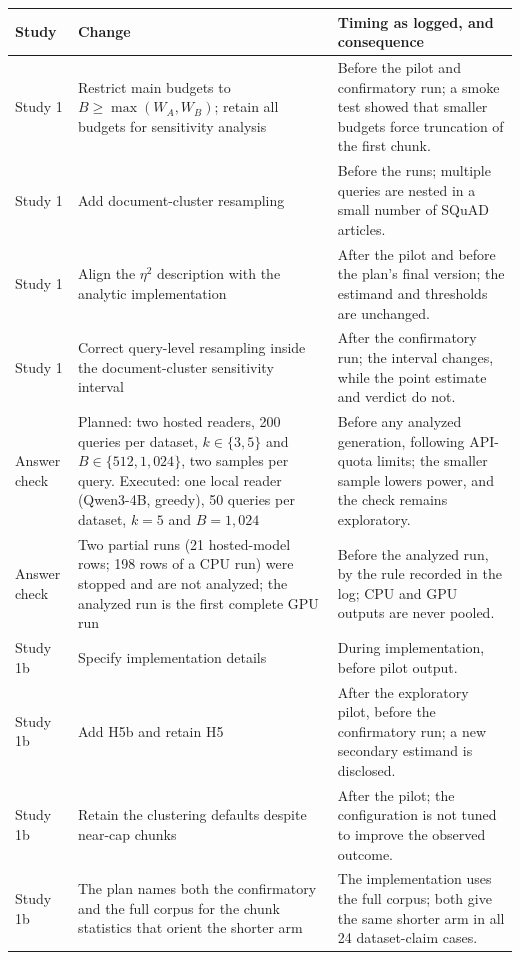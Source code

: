 \documentclass[11pt]{article}
\let\RepoTable\table
\let\EndRepoTable\endtable
\renewenvironment{table}[1][htbp]{\RepoTable[htbp]}{\EndRepoTable}
\begin{document}
\begin{table}[htbp]\centering\footnotesize
\caption{Study-plan deviations (as logged) and differences between the plans' text and the implementation.}\label{tab:deviations}
\begin{tabular}{@{}>{\raggedright\arraybackslash}p{1.55cm}>{\raggedright\arraybackslash}p{5.5cm}>{\raggedright\arraybackslash}p{7.4cm}@{}}\toprule
Study & Change & Timing as logged, and consequence\\\midrule
Study 1 & Restrict main budgets to $B\geq\max(W_A,W_B)$; retain all budgets for sensitivity analysis & Before the pilot and confirmatory run; a smoke test showed that smaller budgets force truncation of the first chunk.\\
Study 1 & Add document-cluster resampling & Before the runs; multiple queries are nested in a small number of SQuAD articles.\\
Study 1 & Align the $\eta^2$ description with the analytic implementation & After the pilot and before the plan's final version; the estimand and thresholds are unchanged.\\
Study 1 & Correct query-level resampling inside the document-cluster sensitivity interval & After the confirmatory run; the interval changes, while the point estimate and verdict do not.\\
Answer check & Planned: two hosted readers, 200 queries per dataset, $k\in\{3,5\}$ and $B\in\{512,1{,}024\}$, two samples per query. Executed: one local reader (Qwen3-4B, greedy), 50 queries per dataset, $k=5$ and $B=1{,}024$ & Before any analyzed generation, following API-quota limits; the smaller sample lowers power, and the check remains exploratory.\\
Answer check & Two partial runs (21 hosted-model rows; 198 rows of a CPU run) were stopped and are not analyzed; the analyzed run is the first complete GPU run & Before the analyzed run, by the rule recorded in the log; CPU and GPU outputs are never pooled.\\
Study 1b & Specify implementation details & During implementation, before pilot output.\\
Study 1b & Add H5b and retain H5 & After the exploratory pilot, before the confirmatory run; a new secondary estimand is disclosed.\\
Study 1b & Retain the clustering defaults despite near-cap chunks & After the pilot; the configuration is not tuned to improve the observed outcome.\\
Study 1b & The plan names both the confirmatory and the full corpus for the chunk statistics that orient the shorter arm & The implementation uses the full corpus; both give the same shorter arm in all 24 dataset-claim cases.\\\midrule

\end{tabular}
\end{table}
\end{document}
